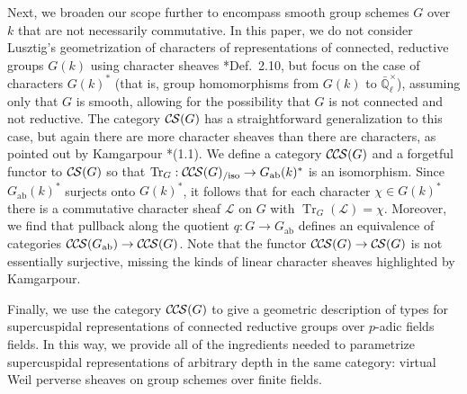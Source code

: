\documentclass[10pt]{amsart}
\theoremstyle{plain}
\theoremstyle{definition}
\newcommand{\EE}{\mathbb{\bar Q}_\ell}
\newcommand{\Fq}{k}
\newcommand{\EEx}{\EE^\times}
\newcommand{\ab}{_{\operatorname{ab}}}
\newcommand{\TrFrob}[1]{\operatorname{Tr}_{#1}}
\newcommand{\cs}[1]{{\mathcal{#1}}}
\newcommand{\CS}{{\mathcal{C\hskip-0.8pt S}}}
\newcommand{\CCS}{{\mathcal{C\hskip-.8pt C\hskip-0.8pt S}}}
\newcommand{\CCSiso}[1]{\CCS(#1)_{/\text{iso}}}
\begin{document}
Next, we broaden our scope further to encompass smooth group schemes $G$ over $\Fq$ that are not necessarily commutative.
In this paper, we do not consider Lusztig's geometrization of characters of representations of connected, reductive groups $G(k)$
using character sheaves \cite{lusztig:85a}*{Def.~2.10}, but focus on the case of characters
$G(k)^*$ (that is, group homomorphisms from $G(k)$ to $\EEx$), assuming only that $G$ is smooth, allowing for the possibility that $G$ is not connected and not reductive.
The category $\CS(G)$ has a straightforward generalization to this case, but again
there are more character sheaves than there are characters, as pointed out by Kamgarpour \cite{kamgarpour:09a}*{(1.1)}.
We define a category $\CCS(G)$ and a forgetful functor to $\CS(G)$ so that $\TrFrob{G} : \CCSiso{G} \to G\ab(k)^*$
is an isomorphism.  
Since $G\ab(k)^*$ surjects onto $G(k)^*$, it follows that for each character $\chi \in G(k)^*$ there is a commutative
character sheaf $\cs{L}$ on $G$ with $\TrFrob{G}(\cs{L}) = \chi$. Moreover, we find that pullback along the quotient $q : G \to G\ab$
defines an equivalence of categories $\CCS(G\ab) \to \CCS(G)$.  Note that the functor $\CCS(G) \to \CS(G)$ is not
essentially surjective, missing the kinds of linear character sheaves highlighted by Kamgarpour.

Finally, we use the category $\CCS(G)$ to give a geometric description of types for supercuspidal representations of connected reductive groups over $p$-adic fields fields.
In this way, we provide all of the ingredients needed to parametrize supercuspidal representations of arbitrary depth in the same category:
virtual Weil perverse sheaves on group schemes over finite fields. 
\end{document}
